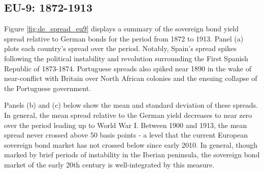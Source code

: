 \documentclass[3p]{elsarticle}
\begin{document}
\subsection{EU-9: 1872-1913}
Figure \ref{fig:de_spread_eu9} displays a summary of the sovereign bond yield spread relative to German bonds for the period from 1872 to 1913.  Panel (a) plots each country's spread over the period.  Notably, Spain's spread spikes following the political instability and revolution surrounding the First Spanish Republic of 1873-1874.  Portuguese spreads also spiked near 1890 in the wake of near-conflict with Britain over North African colonies and the ensuing collapse of the Portuguese government.

Panels (b) and (c) below show the mean and standard deviation of these spreads.  In general, the mean spread relative to the German yield decreases to near zero over the period leading up to World War I.  Between 1900 and 1913, the mean spread never crossed above 50 basis points - a level that the current European sovereign bond market has not crossed below since early 2010.  In general, though marked by brief periods of instability in the Iberian peninsula, the sovereign bond market of the early 20th century is well-integrated by this measure.
\end{document}
